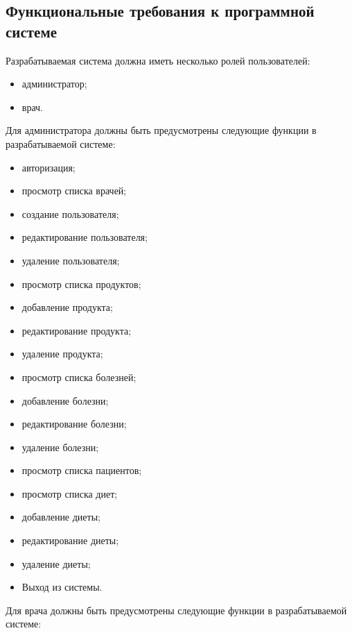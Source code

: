 
\subsection{Функциональные требования к программной системе}

Разрабатываемая система должна иметь несколько ролей
пользователей:

\begin{itemize}
	\item администратор;
	\item врач.
\end{itemize}

Для администратора должны быть предусмотрены следующие функции в разрабатываемой системе: 

\begin{itemize}
	\item авторизация;
	\item просмотр списка врачей;
	\item создание пользователя;
	\item редактирование пользователя;
	\item удаление пользователя;
	\item просмотр списка продуктов;
	\item добавление продукта;
	\item редактирование продукта;
	\item удаление продукта;
	\item просмотр списка болезней;
	\item добавление болезни;
	\item редактирование болезни;
	\item удаление болезни;
	\item просмотр списка пациентов;
	\item просмотр списка диет;
	\item добавление диеты;
	\item редактирование диеты;
	\item удаление диеты;
	\item Выход из системы.
\end{itemize}

Для врача должны быть предусмотрены следующие функции в разрабатываемой системе:

